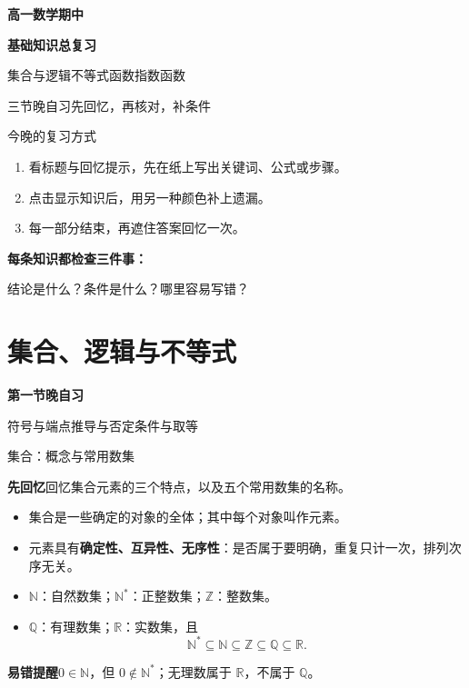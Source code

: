 \documentclass[UTF8,10pt,aspectratio=169,handout]{ctexbeamer}
\newcommand{\Recall}[1]{\par\noindent\textcolor{KnowledgeBlue}{\textbf{先回忆}\quad #1}\par\vspace{0.3cm}}
\newcommand{\Pitfall}[1]{\par\vspace{0.22cm}\noindent\textbf{易错提醒}\quad #1\par}
\newcommand{\Session}[3]{\section{#2}\begin{frame}\vspace{0.7cm}\begin{center}{\Large\bfseries 第#1节晚自习}\par\vspace{0.5cm}{\LARGE\bfseries #2}\par\vspace{0.6cm}#3\end{center}\end{frame}}
\begin{document}
\begin{frame}
\begin{center}
{\LARGE\bfseries 高一数学期中}\par\vspace{0.28cm}
{\LARGE\bfseries 基础知识总复习}\par\vspace{0.55cm}
{\large 集合与逻辑\quad 不等式\quad 函数\quad 指数函数}\par\vspace{0.55cm}
三节晚自习\qquad 先回忆，再核对，补条件
\end{center}
\end{frame}
\begin{frame}[t]{今晚的复习方式}
\begin{enumerate}
\item 看标题与回忆提示，先在纸上写出关键词、公式或步骤。
\item 点击显示知识后，用另一种颜色补上遗漏。
\item 每一部分结束，再遮住答案回忆一次。
\end{enumerate}
\par\vspace{0.5cm}
\textbf{每条知识都检查三件事：}\par\vspace{0.25cm}
结论是什么？\qquad 条件是什么？\qquad 哪里容易写错？
\end{frame}

\Session{一}{集合、逻辑与不等式}{符号与端点\quad 推导与否定\quad 条件与取等}


\begin{frame}[t]{集合：概念与常用数集}
\large
\Recall{回忆集合元素的三个特点，以及五个常用数集的名称。}
\pause
\begin{itemize}
  \item 集合是一些确定的对象的全体；其中每个对象叫作元素。
  \item 元素具有\textbf{确定性、互异性、无序性}：是否属于要明确，重复只计一次，排列次序无关。
  \item $\mathbb N$：自然数集；$\mathbb N^*$：正整数集；$\mathbb Z$：整数集。
  \item $\mathbb Q$：有理数集；$\mathbb R$：实数集，且
  \[\mathbb N^*\subseteq\mathbb N\subseteq\mathbb Z\subseteq\mathbb Q\subseteq\mathbb R.\]
\end{itemize}
\Pitfall{$0\in\mathbb N$，但 $0\notin\mathbb N^*$；无理数属于 $\mathbb R$，不属于 $\mathbb Q$。}
\end{frame}
\end{document}
